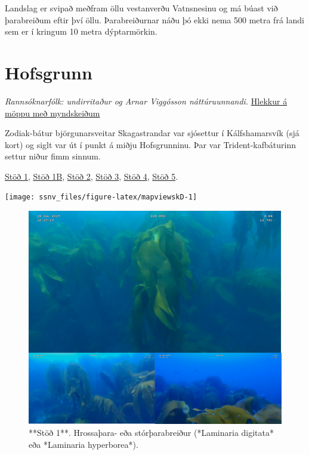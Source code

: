 \documentclass[icelandic,]{book}
\begin{document}
Landslag er svipað meðfram öllu vestanverðu Vatnsnesinu og má búast við þarabreiðum eftir því öllu. Þarabreiðurnar náðu þó ekki nema 500 metra frá landi sem er í kringum 10 metra dýptarmörkin.

\hypertarget{hofsgrunn}{%
\chapter*{Hofsgrunn}\label{hofsgrunn}}

\emph{Rannsóknarfólk: undirritaður og Arnar Viggósson náttúruunnandi.}
\href{https://www.dropbox.com/sh/5e86jwymrmedy8i/AAC7B73fHdewmccaKuRMGQEHa?dl=0}{Hlekkur á möppu með myndskeiðum}

Zodiak-bátur björgunarsveitar Skagastrandar var sjósettur í Kálfshamarsvík (sjá kort) og siglt var út í punkt á miðju Hofsgrunninu. Þar var Trident-kafbáturinn settur niður fimm sinnum.

\href{https://www.dropbox.com/s/mykfrmg4j4nzcam/Trident-Jul-15-124522-HQ.mp4?dl=0}{Stöð 1},
\href{https://www.dropbox.com/s/hrgywt28fjk64mg/Trident-Jul-15-130236-HQ.mp4?dl=0}{Stöð 1B},
\href{https://www.dropbox.com/s/gdrtgzs2q3nn6w0/Trident-Jul-15-131557-HQ.mp4?dl=0}{Stöð 2},
\href{https://www.dropbox.com/s/vv1bobcfzhwtl06/Trident-Jul-15-132942-HQ.mp4?dl=0}{Stöð 3},
\href{https://www.dropbox.com/s/oyqqueli4qow0mo/Trident-Jul-15-134800-HQ.mp4?dl=0}{Stöð 4},
\href{https://www.dropbox.com/s/d1dp5a0bftm3z5n/Trident-Jul-15-140418-HQ.mp4?dl=0}{Stöð 5}.

\begin{center}\texttt{[image: ssnv\_files/figure-latex/mapviewskD-1]} \end{center}

\begin{figure}

{\centering \includegraphics[width=1\linewidth]{skjol/skogar/sk4/stodvar/st1/samsett} 

}

\caption{**Stöð 1**. Hrossaþara- eða stórþarabreiður (*Laminaria digitata* eða *Laminaria hyperborea*).}\label{fig:mynd-sk-fjogur-stod-eitt}
\end{figure}
\end{document}
